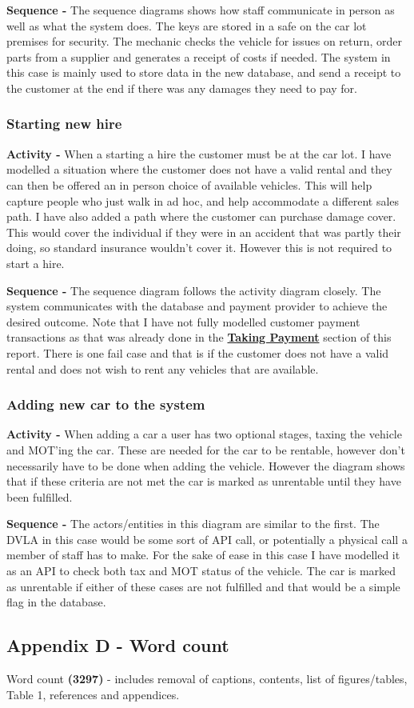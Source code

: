       \noindent\textbf{Sequence -} The sequence diagrams shows how staff communicate in person as well as what the system does. The keys are stored
      in a safe on the car lot premises for security. The mechanic checks the vehicle for issues on return, order parts from a supplier and generates 
      a receipt of costs if needed. The system in this case is mainly used to store data in the new database, and send a receipt to the customer at the 
      end if there was any damages they need to pay for.

    \subsubsection{Starting new hire}
      \textbf{Activity -} When a starting a hire the customer must be at the car lot. I have modelled a situation where the customer does not have
      a valid rental and they can then be offered an in person choice of available vehicles. This will help capture people who just walk in ad hoc,
      and help accommodate a different sales path. I have also added a path where the customer can purchase damage cover. This would cover the
      individual if they were in an accident that was partly their doing, so standard insurance wouldn't cover it. However this is not required to 
      start a hire.

      \noindent\textbf{Sequence -} The sequence diagram follows the activity diagram closely. The system communicates with the database and payment
      provider to achieve the desired outcome. Note that I have not fully modelled customer payment transactions as that was already done in the
      \hyperref[sec:design:payment]{\textbf{Taking Payment}} section of this report. There is one fail case and that is if the customer does not have
      a valid rental and does not wish to rent any vehicles that are available.

    \subsubsection{Adding new car to the system}
      \textbf{Activity -} When adding a car a user has two optional stages, taxing the vehicle and MOT'ing the car. These are needed for the 
      car to be rentable, however don't necessarily have to be done when adding the vehicle. However the diagram shows that if these criteria are not 
      met the car is marked as unrentable until they have been fulfilled.

      \noindent\textbf{Sequence -} The actors/entities in this diagram are similar to the first. The DVLA in this case would be some sort of API call, 
      or potentially a physical call a member of staff has to make. For the sake of ease in this case I have modelled it as an API to check both tax and 
      MOT status of the vehicle. The car is marked as unrentable if either of these cases are not fulfilled and that would be a simple flag in the database.
  
  \newpage

  \subsection{Appendix D - Word count}
    \label{sec:AppendixD}
    Word count \textbf{(3297)} - includes removal of captions, contents, list of figures/tables, Table 1, references and appendices.